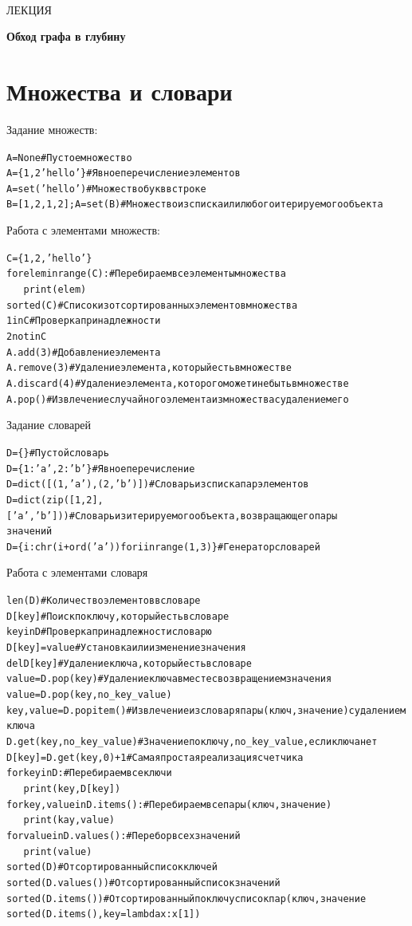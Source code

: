 \documentclass[a4paper,12pt]{article}
\theoremstyle{plain} %
\theoremstyle{definition} %
\theoremstyle{remark} %
\newcounter{infa}[section]
\newcounter{num}
\newcommand{\tab}{\ \ \ }
\newcommand{\com}[1]{{\color{grey}\# #1}}
\newcommand{\ini}{{\color{infa}in}}
\newcommand{\rangei}{{\color{infa}range}}
\newcommand{\fori}{{\color{infa}for}}
\newcommand{\printi}{{\color{infa1}print}}
\newcommand{\seti}{{\color{infa}set}}
\newcommand{\noti}{{\color{infa}not}}
\newcommand{\dicti}{{\color{infa}dict}}
\newcommand{\zipi}{{\color{infa}zip}}
\newcommand{\chri}{{\color{infa}chr}}
\newcommand{\ordi}{{\color{infa}ord}}
\newcommand{\leni}{{\color{infa}len}}
\newcommand{\deli}{{\color{infa}del}}
\newcommand{\sortedi}{{\color{infa}sorted}}
\newcommand{\keyi}{{\color{infa}key}}
\newcommand{\lambdai}{{\color{infa}lambda}}
\newenvironment{infanoname}{
	
	\begin{alltt}%
	}{\end{alltt}
	\setcounter{num}{0}
	\vspace{0.1cm}}
\begin{document}
\newcommand{\lec}[1]{\addtocounter{lec}{1} \setcounter{section}{0}%
\begin{center}
{\LARGE ЛЕКЦИЯ %
\vspace{2mm}%

\textbf{#1}%
}
\end{center}
}
\newpage
\
\setcounter{lec}{17}
\lec{Обход графа в глубину}
\section{Множества и словари}
\noindent Задание множеств:
\begin{infanoname}
A = None \com{Пустое множество}
A = \{1, 2 'hello'\} \com{Явное перечисление элементов}
A = \seti('hello') \com{Множество букв в строке}
B = [1, 2, 1, 2]; A = \seti(B) \com{Множество из списка или любого итерируемого объекта}
\end{infanoname}
Работа с элементами множеств:
\begin{infanoname}
C = \{1, 2, 'hello'\}
\fori elem \ini \rangei(C): \com{Перебираем все элементы множества}
\tab \printi(elem)
sorted(C) \com{Список из отсортированных элементов множества}
1 \ini C \com{Проверка принадлежности}
2 \noti \ini C
A.add(3) \com{Добавление элемента}
A.remove(3) \com{Удаление элемента, который есть в множестве}
A.discard(4) \com{Удаление элемента, которого может и не быть в множестве}
A.pop() \com{Извлечение случайного элемента из множества с удалением его}
\end{infanoname}
Задание словарей
\begin{infanoname}
D = \{\} \com{Пустой словарь}
D = \{1: 'a', 2: 'b'\} \com{Явное перечисление}
D = \dicti([(1, 'a'), (2, 'b')]) \com{Словарь из списка пар элементов}
D = \dicti(\zipi([1, 2], ['a', 'b'])) \com{Словарь из итерируемого объекта, возвращающего пары\\ значений}
D = \{i: \chri(i + \ordi('a')) \fori i \ini \rangei(1, 3)\} \com{Генератор словарей}
\end{infanoname}
Работа с элементами словаря
\begin{infanoname}
\leni(D) \com{Количество элементов в словаре}
D[key] \com{Поиск по ключу, который есть в словаре}
key in D \com{Проверка принадлежности словарю}
D[key] = value \com{Установка или изменение значения}
\deli D[key] \com{Удаление ключа, который есть в словаре}
value = D.pop(key) \com{Удаление ключа вместе с возвращением значения}
value = D.pop(key, no_key_value)
key, value = D.popitem() \com{Извлечение из словаря пары (ключ, значение) с удалением ключа}
D.get(key, no_key_value) \com{Значение по ключу, no_key_value, если ключа нет}
D[key] = D.get(key, 0) + 1 \com{Самая простая реализация счетчика}
\fori key \ini D: \com{Перебираем все ключи}
\tab \printi(key, D[key])
\fori key, value \ini D.items(): \com{Перебираем все пары (ключ, значение)}
\tab \printi(kay, value)
\fori value \ini D.values(): \com{Перебор всех значений}
\tab \printi(value)
\sortedi(D) \com{Отсортированный список ключей}
\sortedi(D.values()) \com{Отсортированный список значений}
\sortedi(D.items()) \com{Отсортированный по ключу список пар (ключ, значение}
\sortedi(D.items(), \keyi = \lambdai x: x[1])
\end{infanoname}
\end{document}
